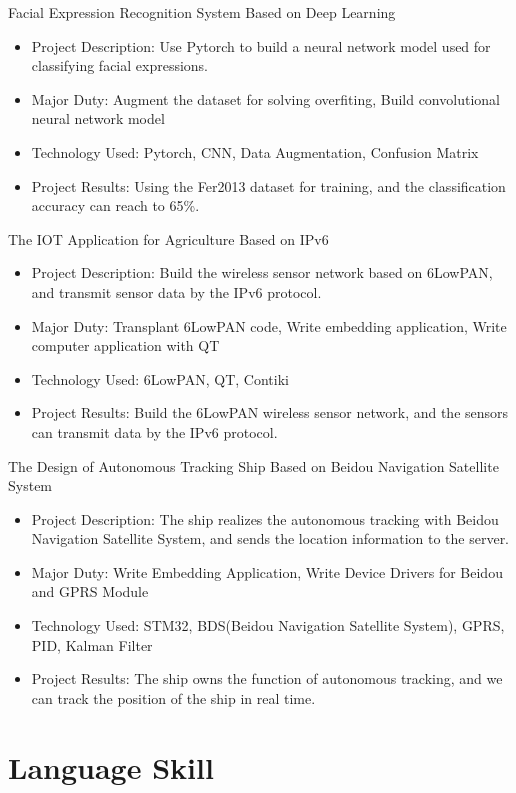 \documentclass[11pt, a4paper]{moderncv}
\begin{document}
	{Facial Expression Recognition System Based on Deep Learning}
	{}{}{}{
		\begin{itemize}
			\item Project Description: Use Pytorch to build a neural network model used for classifying facial expressions.
			\item Major Duty: Augment the dataset for solving overfiting, Build convolutional neural network model
			\item Technology Used: Pytorch, CNN, Data Augmentation, Confusion Matrix
			\item Project Results: Using the Fer2013 dataset for training, and the classification accuracy can reach to 65\%.
	\end{itemize}}{}

	{The IOT Application for Agriculture Based on IPv6}
	{}{}{}{
		\begin{itemize}
			\item Project Description: Build the wireless sensor network based on 6LowPAN, and transmit sensor data by the IPv6 protocol.
			\item Major Duty: Transplant 6LowPAN code, Write embedding application, Write computer application with QT 
			\item Technology Used: 6LowPAN, QT, Contiki
			\item Project Results: Build the 6LowPAN wireless sensor network, and the sensors can transmit data by the IPv6 protocol.
	\end{itemize}}{}

	{The Design of Autonomous Tracking Ship Based on Beidou Navigation Satellite System}
	{}{}{}{
		\begin{itemize}
			\item Project Description: The ship realizes the autonomous tracking with Beidou Navigation Satellite System, and sends the location information to the server.
			\item Major Duty: Write Embedding Application, Write Device Drivers for Beidou and GPRS Module
			\item Technology Used: STM32, BDS(Beidou Navigation Satellite System), GPRS, PID, Kalman Filter
			\item Project Results: The ship owns the function of autonomous tracking, and we can track the position of the ship in real time. 
	\end{itemize}}{}

	\section{Language Skill}
\end{document}
